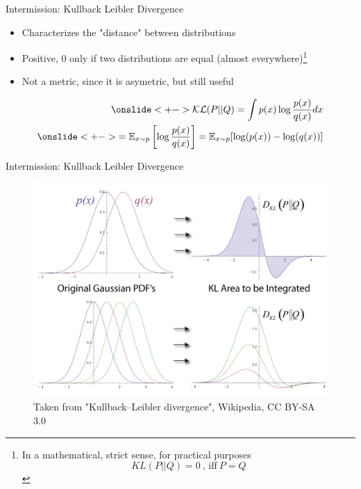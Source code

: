 \documentclass[10pt,aspectratio=169,handout]{beamer}
\begin{document}
\begin{frame}{Intermission: Kullback Leibler Divergence}
    \begin{itemize}[<+->]
        \item Characterizes the "distance" between distributions
        \item Positive, 0 only if two distributions are equal (almost everywhere)\footnote{In a mathematical, strict sense, for practical purposes $$KL(P||Q)  = 0~\text{, iff}~ P = Q$$}
        \item Not a metric, since it is asymetric, but still useful
    \end{itemize}
    \begin{align*}
        \onslide<+->{\mathcal{KL}(P||Q) = \int p(x) \log\frac{p(x)}{q(x)}dx}\\
        \onslide<+->{= \mathbb{E}_{x\sim p}\left[\log\frac{p(x)}{q(x)}\right] = \mathbb{E}_{x\sim p}[\log(p(x)) - \log(q(x))]}
    \end{align*}
\end{frame}

\begin{frame}{Intermission: Kullback Leibler Divergence}
    \begin{center}
        \begin{figure}
            \includegraphics[height=0.8\textheight]{figs/kl.png}
            \caption{Taken from "Kullback–Leibler divergence", Wikipedia, CC BY-SA 3.0}
        \end{figure}
    \end{center}
\end{frame}
\end{document}
